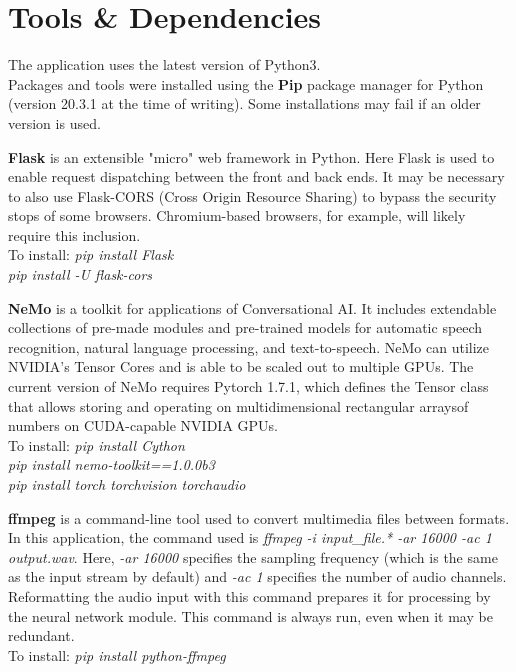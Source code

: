 \documentclass[12pt, letterpaper]{article}
\begin{document}
\section*{Tools \& Dependencies}
The application uses the latest version of Python3.\\
Packages and tools were installed using the \textbf{Pip} package manager for Python (version 20.3.1 at the time of writing). Some installations may fail if an older version is used.

\textbf{Flask} is an extensible "micro" web framework in Python. Here Flask is used to enable request dispatching between the front and back ends. It may be necessary to also use Flask-CORS (Cross Origin Resource Sharing) to bypass the security stops of some browsers. Chromium-based browsers, for example, will likely require this inclusion.
\\To install: \textit{pip install Flask}
\\\hspace*{19mm} \textit{pip install -U flask-cors}

\textbf{NeMo} is a toolkit for applications of Conversational AI. It includes extendable collections of pre-made modules and pre-trained models for automatic speech recognition, natural language processing, and text-to-speech. NeMo can utilize NVIDIA's Tensor Cores and is able to be scaled out to multiple GPUs. The current version of NeMo requires Pytorch 1.7.1, which defines the Tensor class that allows storing and operating on multidimensional rectangular arraysof numbers on CUDA-capable NVIDIA GPUs.
\\To install: \textit{pip install Cython}
\\\hspace*{19mm} \textit{pip install nemo-toolkit==1.0.0b3}
\\\hspace*{19mm} \textit{pip install torch torchvision torchaudio}

\textbf{ffmpeg} is a command-line tool used to convert multimedia files between formats. In this application, the command used is \textit{ffmpeg -i input\_file.* -ar 16000 -ac 1 output.wav}. Here, \textit{-ar 16000} specifies the sampling frequency (which is the same as the input stream by default) and \textit{-ac 1} specifies the number of audio channels. Reformatting the audio input with this command prepares it for processing by the neural network module. This command is always run, even when it may be redundant.
\\To install: \textit{pip install python-ffmpeg}
\end{document}
